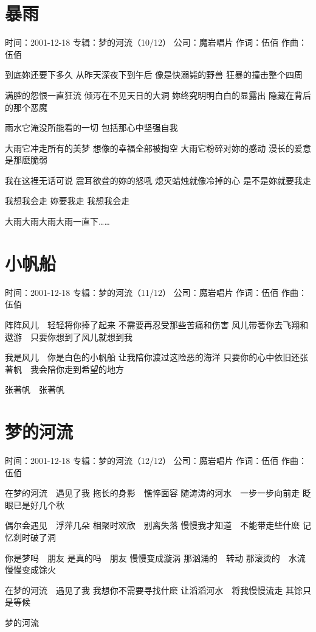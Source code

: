 \documentclass[UTF8,a4paper,oneside,twocolumn,12pt]{ctexbook}
\newcommand{\infopair}[2]{\textbullet #1：#2}
\newcommand{\zc}[1][伍佰]{\infopair{作词}{#1}}
\newcommand{\zq}[1][伍佰]{\infopair{作曲}{#1}}
\newcommand{\zj}[1]{\infopair{专辑}{#1}}
\newcommand{\sj}[1]{\infopair{时间}{#1}}
\newcommand{\gs}[1]{\infopair{公司}{#1}}
\newenvironment{info}{\begin{flushleft}\kaishu
	}
	{\end{flushleft}\normalsize\yahei\par}
\newenvironment{lyric}{
	}
{}
\begin{document}
\section{暴雨}
\begin{info}
	\sj{2001-12-18}
	\zj{梦的河流（10/12）}
	\gs{魔岩唱片}
	\zc
	\zq
\end{info}
\begin{lyric}
	到底妳还要下多久
	从昨天深夜下到午后
	像是快溺毙的野兽
	狂暴的撞击整个四周

	满腔的怨恨一直狂流
	倾泻在不见天日的大洞
	妳终究明明白白的显露出
	隐藏在背后的那个恶魔

	雨水它淹没所能看的一切
	包括那心中坚强自我

	大雨它冲走所有的美梦
	想像的幸福全部被掏空
	大雨它粉碎对妳的感动
	漫长的爱意是那麽脆弱

	我在这裡无话可说
	震耳欲聋的妳的怒吼
	熄灭蜡烛就像冷掉的心
	是不是妳就要我走

	我想我会走
	妳要我走
	我想我会走

	大雨大雨大雨大雨一直下……
\end{lyric}

\section{小帆船}
\begin{info}
	\sj{2001-12-18}
	\zj{梦的河流（11/12）}
	\gs{魔岩唱片}
	\zc
	\zq
\end{info}
\begin{lyric}
	阵阵风儿　轻轻将你捧了起来
	不需要再忍受那些苦痛和伤害
	风儿带著你去飞翔和遨游　只要你想到了风儿就想到我

	我是风儿　你是白色的小帆船
	让我陪你渡过这险恶的海洋
	只要你的心中依旧还张著帆　我会陪你走到希望的地方

	张著帆　张著帆
\end{lyric}

\section{梦的河流}
\begin{info}
	\sj{2001-12-18}
	\zj{梦的河流（12/12）}
	\gs{魔岩唱片}
	\zc
	\zq
\end{info}
\begin{lyric}
	在梦的河流　遇见了我
	拖长的身影　憔悴面容
	随涛涛的河水　一步一步向前走
	眨眼已是好几个秋

	偶尔会遇见　浮萍几朵
	相聚时欢欣　别离失落
	慢慢我才知道　不能带走些什麽
	记忆刹时破了洞

	你是梦吗　朋友
	是真的吗　朋友
	慢慢变成漩涡
	那汹涌的　转动
	那滚烫的　水流
	慢慢变成馀火

	在梦的河流　遇见了我
	我想你不需要寻找什麽
	让滔滔河水　将我慢慢流走
	其馀只是等候

	梦的河流
\end{lyric}
\end{document}
